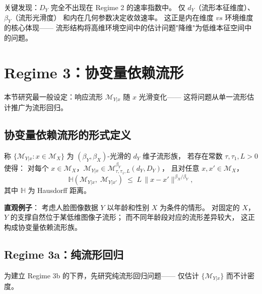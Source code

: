 \begin{Remark}\label{rem:regime2-env-dim}
    关键发现：$D_Y$ 完全不出现在 Regime 2 的速率指数中。
    仅 $d_Y$（流形本征维度）、$\beta_Y$（流形光滑度）
    和内在几何参数决定收敛速率。
    这正是内在维度 $vs$ 环境维度的核心体现——
    流形结构将高维环境空间中的估计问题"降维"为低维本征空间中的问题。
\end{Remark}

\section{Regime 3：协变量依赖流形}\label{sec:ch2-regime3}

本节研究最一般设定：响应流形 $\mathcal{M}_{Y|x}$ 随 $x$ 光滑变化——
这将问题从单一流形估计推广为流形回归。

\subsection{协变量依赖流形的形式定义}\label{sec:ch2-covdep-manifold}

\begin{Definition}\label{def:covdep-manifold}
    称 $\{\mathcal{M}_{Y|x} : x \in \mathcal{M}_X\}$ 为
    $(\beta_Y, \beta_X)$-光滑的 $d_Y$ 维子流形族，
    若存在常数 $\tau, \tau_1, L > 0$ 使得：
    对每个 $x \in \mathcal{M}_X$，$\mathcal{M}_{Y|x} \in
       \mathcal{M}_{\tau,\tau_1,L}^{\beta_Y}(d_Y, D_Y)$，
    且对任意 $x, x' \in \mathcal{M}_X$，
    \[
        \mathbb{H}(\mathcal{M}_{Y|x},\; \mathcal{M}_{Y|x'})
        \;\leq\; L\,\|x - x'\|^{\beta_X/\beta_Y},
    \]
    其中 $\mathbb{H}$ 为 Hausdorff 距离。
\end{Definition}

\textbf{直观例子}：
考虑人脸图像数据 $Y$ 以年龄和性别 $X$ 为条件的情形。
对固定的 $X$，$Y$ 的支撑自然位于某低维图像子流形；
而不同年龄段对应的流形差异较大，
这正构成协变量依赖流形族。

\subsection{Regime 3a：纯流形回归}\label{sec:ch2-regime3a}

为建立 Regime 3b 的下界，先研究纯流形回归问题——
仅估计 $\{\mathcal{M}_{Y|x}\}$ 而不计密度。

